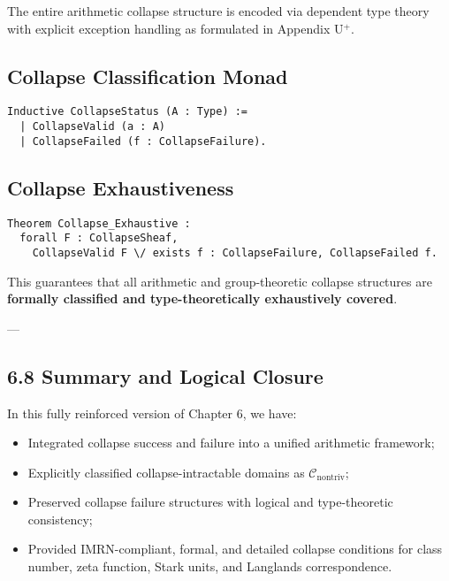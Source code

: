 \documentclass[11pt]{article}
\begin{document}
The entire arithmetic collapse structure is encoded via dependent type theory with explicit exception handling as formulated in Appendix U$^{+}$.

\subsection*{Collapse Classification Monad}

\begin{lstlisting}[language=Coq]
Inductive CollapseStatus (A : Type) :=
  | CollapseValid (a : A)
  | CollapseFailed (f : CollapseFailure).
\end{lstlisting}

\subsection*{Collapse Exhaustiveness}

\begin{lstlisting}[language=Coq]
Theorem Collapse_Exhaustive :
  forall F : CollapseSheaf,
    CollapseValid F \/ exists f : CollapseFailure, CollapseFailed f.
\end{lstlisting}


This guarantees that all arithmetic and group-theoretic collapse structures are \textbf{formally classified and type-theoretically exhaustively covered}.

---

\subsection*{6.8 Summary and Logical Closure}

In this fully reinforced version of Chapter 6, we have:

\begin{itemize}
    \item Integrated collapse success and failure into a unified arithmetic framework;
    \item Explicitly classified collapse-intractable domains as \( \mathcal{C}_{\mathrm{nontriv}} \);
    \item Preserved collapse failure structures with logical and type-theoretic consistency;
    \item Provided IMRN-compliant, formal, and detailed collapse conditions for class number, zeta function, Stark units, and Langlands correspondence.
\end{itemize}
\end{document}
